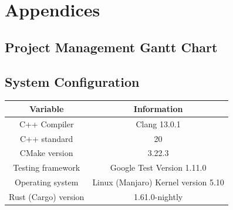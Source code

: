 \documentclass[a4paper]{article}
\begin{document}
\section{Appendices}

\appendix
    \newpage
    \subsection{Project Management Gantt Chart}\label{appendix:gantt}
\begin{figure}[H]

\end{figure}
\newpage

\subsection{System Configuration}\label{appendix:system-configuration}
\begin{table}[H]
	\centering
	\begin{tabular}{||c | c||}
		\hline
		Variable & Information \\ [0.5ex]
		\hline\hline
		C++ Compiler    & Clang 13.0.1    \\
        \hline
		C++ standard    & 20    \\
        \hline
		CMake version    & 3.22.3    \\
        \hline
		Testing framework    & Google Test Version 1.11.0  \\
        \hline
		Operating system    & Linux (Manjaro) Kernel version 5.10  \\

        \hline
		Rust (Cargo) version    & 1.61.0-nightly  \\

		\hline
	\end{tabular}
\end{table}
\end{document}
